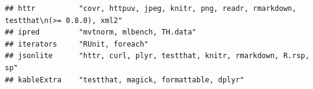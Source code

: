 \documentclass[]{article}
\begin{document}
\begin{verbatim}
## httr          "covr, httpuv, jpeg, knitr, png, readr, rmarkdown, testthat\n(>= 0.8.0), xml2"                                                                                                                                                                                                                                                                                                                                                                                                                                                                                                            
## ipred         "mvtnorm, mlbench, TH.data"                                                                                                                                                                                                                                                                                                                                                                                                                                                                                                                                                               
## iterators     "RUnit, foreach"                                                                                                                                                                                                                                                                                                                                                                                                                                                                                                                                                                          
## jsonlite      "httr, curl, plyr, testthat, knitr, rmarkdown, R.rsp, sp"                                                                                                                                                                                                                                                                                                                                                                                                                                                                                                                                 
## kableExtra    "testthat, magick, formattable, dplyr"                                                                                                                                                                                                                                                                                                                                                                                                                                                                                                                                                    

\end{verbatim}
\end{document}
